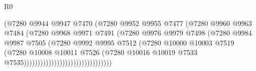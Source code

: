 \begin{lexlean}{R0}
\begin{coremodule}
                                                (@7280
                                                  @9944
                                                  @9947
                                                  @7470
                                                  (@7280
                                                    @9952
                                                    @9955
                                                    @7477
                                                    (@7280
                                                      @9960
                                                      @9963
                                                      @7484
                                                      (@7280
                                                        @9968
                                                        @9971
                                                        @7491
                                                        (@7280
                                                          @9976
                                                          @9979
                                                          @7498
                                                          (@7280
                                                            @9984
                                                            @9987
                                                            @7505
                                                            (@7280
                                                              @9992
                                                              @9995
                                                              @7512
                                                              (@7280
                                                                @10000
                                                                @10003
                                                                @7519
                                                                (@7280
                                                                  @10008
                                                                  @10011
                                                                  @7526
                                                                  (@7280
                                                                    @10016
                                                                    @10019
                                                                    @7533
                                                                    @7535))))))))))))))))))))))))))))))))

\end{coremodule}
\end{lexlean}

